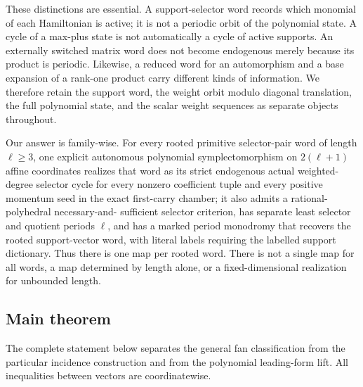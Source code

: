\documentclass[11pt,letterpaper]{article}
\theoremstyle{definition}
\theoremstyle{remark}
\numberwithin{equation}{section}
\begin{document}
These distinctions are essential.  A support-selector word records which
monomial of each Hamiltonian is active; it is not a periodic orbit of the
polynomial state.  A cycle of a max-plus state is not automatically a cycle
of active supports.  An externally switched matrix word does not become
endogenous merely because its product is periodic.  Likewise, a reduced word
for an automorphism and a base expansion of a rank-one product carry
different kinds of information.  We therefore retain the support word, the
weight orbit modulo diagonal translation, the full polynomial state, and the
scalar weight sequences as separate objects throughout.

Our answer is family-wise.  For every rooted primitive selector-pair word of
length \(\ell\geq3\), one explicit autonomous polynomial
symplectomorphism on \(2(\ell+1)\) affine coordinates realizes that word as
its strict endogenous actual weighted-degree selector cycle for every
nonzero coefficient tuple and every positive momentum seed in the exact
first-carry chamber; it also admits a rational-polyhedral necessary-and-
sufficient selector criterion, has separate least selector and quotient
periods \(\ell\), and has a marked period monodromy that recovers the rooted
support-vector word, with literal labels requiring the labelled support
dictionary.  Thus there is one map per rooted word.  There is not a single
map for all words, a map determined by length alone, or a fixed-dimensional
realization for unbounded length.

\subsection{Main theorem}

The complete statement below separates the general fan classification from
the particular incidence construction and from the polynomial leading-form
lift.  All inequalities between vectors are coordinatewise.
\end{document}
